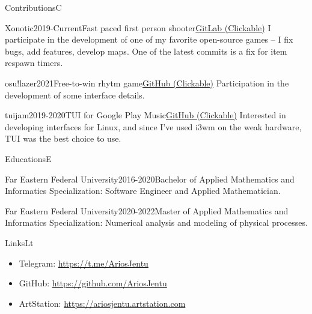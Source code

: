 \documentclass[10pt]{extarticle}
\begin{document}
	\begin{centralpart}{Contributions}{C}{}
		\begin{titleblock}{Xonotic}{2019-Current}{Fast paced first person shooter}{\href{https://gitlab.com/xonotic}{GitLab (Clickable)}}
			\hspace{15pt} I participate in the development of one of my favorite open-source games -- I fix bugs, add features, develop maps. One of the latest commits is a fix for item respawn timers.
		\end{titleblock}
		
		\begin{titleblock}{osu!lazer}{2021}{Free-to-win rhytm game}{\href{https://github.com/ppy/osu}{GitHub (Clickable)}}
			\hspace{15pt} Participation in the development of some interface details.
		\end{titleblock}
		
		\begin{titleblock}{tuijam}{2019-2020}{TUI for Google Play Music}{\href{https://github.com/AriosJentu/tuijam}{GitHub (Clickable)}}
			\hspace{15pt} Interested in developing interfaces for Linux, and since I've used i3wm on the weak hardware, TUI was the best choice to use.
		\end{titleblock}
	\end{centralpart}


	\UpdatePosition
	\begin{centralpart}{Educations}{E}{}
		\begin{titleblock}{Far Eastern Federal University}{2016-2020}{Bachelor of Applied Mathematics and Informatics}{}
			Specialization: Software Engineer and Applied Mathematician.
		\end{titleblock}
		\begin{titleblock}{Far Eastern Federal University}{2020-2022}{Master of Applied Mathematics and Informatics}{}
			Specialization: Numerical analysis and modeling of physical processes.
		\end{titleblock}
	\end{centralpart}

	\UpdatePosition
	\begin{centralpart}{Links}{L}{t}
		\begin{titleblock}{}{}{}{}
			\vspace*{-25pt}
			\begin{itemize}[label=$\circ$]
				\item Telegram: {\color{sidetopsep}\href{https://t.me/AriosJentu}{https://t.me/AriosJentu}} \vp
				\item GitHub: {\color{sidetopsep}\href{https://github.com/AriosJentu}{https://github.com/AriosJentu}} \vp
				\item ArtStation: {\color{sidetopsep}\href{https://AriosJentu.artstation.com/}{https://ariosjentu.artstation.com}} \vp
			\end{itemize}
		\end{titleblock}
	\end{centralpart}
\end{document}
